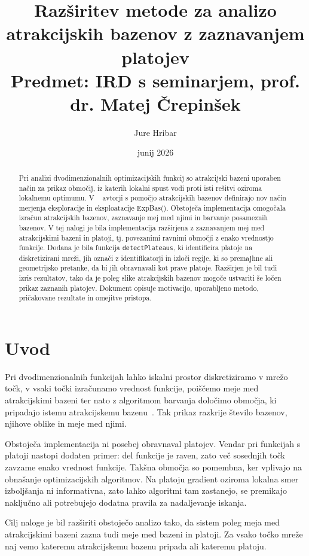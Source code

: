\documentclass[12pt,a4paper]{article}
\title{Razširitev metode za analizo atrakcijskih bazenov z zaznavanjem platojev\\[0.5em]
\large Predmet: IRD s seminarjem, prof. dr. Matej Črepinšek}
\author{Jure Hribar}
\date{junij 2026}
\begin{document}
\maketitle

\begin{abstract}
Pri analizi dvodimenzionalnih optimizacijskih funkcij so atrakcijski bazeni uporaben način za prikaz območij, iz katerih lokalni spust vodi proti isti rešitvi oziroma lokalnemu optimumu. V ~\cite{jerebic_novel_2021} avtorji s pomočjo atrakcijskih bazenov definirajo nov način merjenja eksploracije in eksploatacije ExpBas(). Obstoječa implementacija omogočala izračun atrakcijskih bazenov, zaznavanje mej med njimi in barvanje posameznih bazenov. V tej nalogi je bila implementacija razširjena z zaznavanjem mej med atrakcijskimi bazeni in platoji, tj. povezanimi ravnimi območji z enako vrednostjo funkcije. Dodana je bila funkcija \texttt{detectPlateaus}, ki identificira platoje na diskretizirani mreži, jih označi z identifikatorji in izloči regije, ki so premajhne ali geometrijsko pretanke, da bi jih obravnavali kot prave platoje. Razširjen je bil tudi izris rezultatov, tako da je poleg slike atrakcijskih bazenov mogoče ustvariti še ločen prikaz zaznanih platojev. Dokument opisuje motivacijo, uporabljeno metodo, pričakovane rezultate in omejitve pristopa.
\end{abstract}

\section{Uvod}

Pri dvodimenzionalnih funkcijah lahko iskalni prostor diskretiziramo v mrežo točk, v vsaki točki izračunamo vrednost funkcije, poiščemo meje med atrakcijskimi bazeni ter nato z algoritmom barvanja določimo območja, ki pripadajo istemu atrakcijskemu bazenu~\cite{jerebic_novel_2021}. Tak prikaz razkrije število bazenov, njihove oblike in meje med njimi.

Obstoječa implementacija ni posebej obravnaval platojev. Vendar pri funkcijah s platoji nastopi dodaten primer: del funkcije je raven, zato več sosednjih točk zavzame enako vrednost funkcije. Takšna območja so pomembna, ker vplivajo na obnašanje optimizacijskih algoritmov. Na platoju gradient oziroma lokalna smer izboljšanja ni informativna, zato lahko algoritmi tam zastanejo, se premikajo naključno ali potrebujejo dodatna pravila za nadaljevanje iskanja.

Cilj naloge je bil razširiti obstoječo analizo tako, da sistem poleg meja med atrakcijskimi bazeni zazna tudi meje med bazeni in platoji. Za vsako točko mreže naj vemo kateremu atrakcijskemu bazenu pripada ali kateremu platoju.
\end{document}
